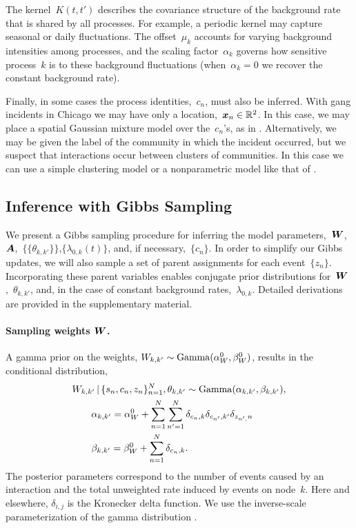 The kernel~${K(t,t')}$ describes the covariance structure of the background rate that is shared by all processes. For example, a periodic kernel may capture seasonal or daily fluctuations. The offset~${\mu_k}$ accounts for varying background intensities among processes, and the scaling factor~$\alpha_k$ governs how sensitive process~$k$ is to these background fluctuations (when~${\alpha_k=0}$ we recover the constant background rate).

Finally, in some cases the process identities,~${c_n}$, must also be inferred. With gang incidents in Chicago we may have only a location,~${\boldsymbol{x}_n\in\mathbb{R}^2}$. In this case, we may place a spatial Gaussian mixture model over the~$c_n$'s, as in \citet{Cho-2013}. Alternatively, we may be given the label of the community in which the incident occurred, but we suspect that interactions occur between clusters of communities. In this case we can use a simple clustering model or a nonparametric model like that of \citet{Blundell-2012}. 

\subsection{Inference with Gibbs Sampling}
We present a Gibbs sampling procedure for inferring the model parameters,~$\boldsymbol{W}$,~$\boldsymbol{A}$,~$\{\{\theta_{k,k'}\}\}$,$\{\lambda_{0,k}(t)\}$, and, if necessary,~${\{c_n\}}$. In order to simplify our Gibbs updates, we will also sample a set of parent assignments for each event~$\{z_n\}$. Incorporating these parent variables enables conjugate prior distributions for~$\boldsymbol{W}$,~$\theta_{k,k'}$, and, in the case of constant background rates,~$\lambda_{0,k}$. Detailed derivations are provided in the supplementary material.

\paragraph{Sampling weights $\boldsymbol{W}$.} A gamma prior on the weights, ${W_{k,k'}\sim\mathrm{Gamma}(\alpha_W^{0}, \beta_W^{0})}$, results in the conditional distribution,
\begin{align*}
&W_{k,k'}\,|\, \{s_n,c_n,z_n\}^N_{n=1}, \theta_{k,k'} \sim
\mathrm{Gamma}(\alpha_{k,k'}, \beta_{k,k'}),\\ 
&\qquad\alpha_{k,k'} = \alpha_W^0 + \sum_{n=1}^N\sum_{n'=1}^N \delta_{c_n,k}\delta_{c_{n'},k'}\delta_{z_{n',}n}\\ 
&\qquad\beta_{k,k'} = \beta_W^0 + \sum_{n=1}^N \delta_{c_n,k}.
\end{align*}
The posterior parameters correspond to the number of events caused by an interaction and the total unweighted rate induced by events on node~$k$.
Here and elsewhere, $\delta_{i,j}$ is the Kronecker delta function. We use the inverse-scale parameterization of the gamma distribution
.

